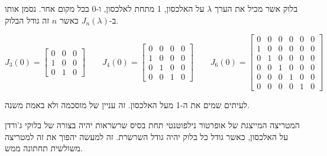 \documentclass{tstextbook}
\begin{document}
\begin{definition}
בלוק אשר מכיל את הערך \(\lambda\) על האלכסון, 1 מתחת לאלכסון, ו-0 בכל מקום אחר. נסמן אותו ב-\(J_{n}\left( \lambda \right)\) כאשר \(n\) זה גודל הבלוק. 

\end{definition}
\begin{example}
$$J_{3}(0)= \left[\begin{matrix}0 & 0 & 0\\1 & 0 & 0\\0 & 1 & 0\end{matrix}\right]\qquad J_{4}(0)=\left[\begin{matrix}0 & 0 & 0 & 0\\1 & 0 & 0 & 0\\0 & 1 & 0 & 0\\0 & 0 & 1 & 0\end{matrix}\right]\qquad  J_{6}(0)=\left[\begin{matrix}0 & 0 & 0 & 0 & 0 & 0\\1 & 0 & 0 & 0 & 0 & 0\\0 & 1 & 0 & 0 & 0 & 0\\0 & 0 & 1 & 0 & 0 & 0\\0 & 0 & 0 & 1 & 0 & 0\\0 & 0 & 0 & 0 & 1 & 0\end{matrix}\right]$$

\end{example}
\begin{remark}
לעיתים שמים את ה-1 מעל האלכסון. זה עניין של מוסכמה ולא באמת משנה.

\end{remark}
\begin{proposition}
המטריצה המייצגת של אופרטור נילפוטנטי תחת בסיס שרשראות יהיה בצורה של בלוקי ג'ורדן על האלכסון, כאשר גודל כל בלוק יהיה גודל השרשרת. זה למעשה יהפוך את זה למטריצה משולשית תחתונה ממש.

\end{proposition}
\end{document}

